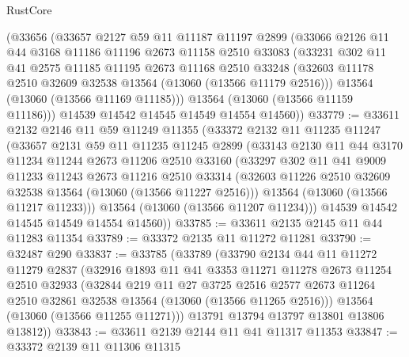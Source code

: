 \begin{lexlean}{RustCore}
\begin{coremodule}
    (@33656
      (@33657
        @2127
        @59
        @11
        @11187
        @11197
        @2899
        (@33066
          @2126
          @11
          @44
          @3168
          @11186
          @11196
          @2673
          @11158
          @2510
          @33083
          (@33231
            @302
            @11
            @41
            @2575
            @11185
            @11195
            @2673
            @11168
            @2510
            @33248
            (@32603 @11178 @2510 @32609 @32538 @13564 (@13060 (@13566 @11179 @2516)))
            @13564
            (@13060 (@13566 @11169 @11185)))
          @13564
          (@13060 (@13566 @11159 @11186)))
        @14539
        @14542
        @14545
        @14549
        @14554
        @14560))
@33779 := @33611
    @2132
    @2146
    @11
    @59
    @11249
    @11355
    (@33372
      @2132
      @11
      @11235
      @11247
      (@33657
        @2131
        @59
        @11
        @11235
        @11245
        @2899
        (@33143
          @2130
          @11
          @44
          @3170
          @11234
          @11244
          @2673
          @11206
          @2510
          @33160
          (@33297
            @302
            @11
            @41
            @9009
            @11233
            @11243
            @2673
            @11216
            @2510
            @33314
            (@32603 @11226 @2510 @32609 @32538 @13564 (@13060 (@13566 @11227 @2516)))
            @13564
            (@13060 (@13566 @11217 @11233)))
          @13564
          (@13060 (@13566 @11207 @11234)))
        @14539
        @14542
        @14545
        @14549
        @14554
        @14560))
@33785 := @33611 @2135 @2145 @11 @44 @11283 @11354
@33789 := @33372 @2135 @11 @11272 @11281
@33790 := @32487 @290
@33837 := @33785
    (@33789
      (@33790
        @2134
        @44
        @11
        @11272
        @11279
        @2837
        (@32916
          @1893
          @11
          @41
          @3353
          @11271
          @11278
          @2673
          @11254
          @2510
          @32933
          (@32844
            @219
            @11
            @27
            @3725
            @2516
            @2577
            @2673
            @11264
            @2510
            @32861
            @32538
            @13564
            (@13060 (@13566 @11265 @2516)))
          @13564
          (@13060 (@13566 @11255 @11271)))
        @13791
        @13794
        @13797
        @13801
        @13806
        @13812))
@33843 := @33611 @2139 @2144 @11 @41 @11317 @11353
@33847 := @33372 @2139 @11 @11306 @11315

\end{coremodule}
\end{lexlean}
